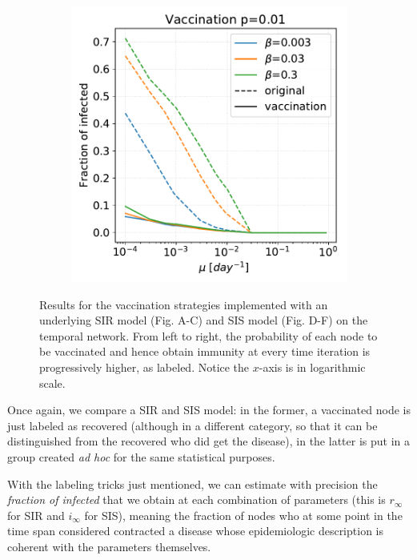 \documentclass[a4paper,11pt, twocolumn]{article}
\begin{document}
\begin{figure}[t!]
\begin{subfigure}[t]{0.32\textwidth}
\caption{}
\end{subfigure}
\begin{subfigure}[t]{0.32\textwidth}
 \centering
\includegraphics[scale=0.30]{./Figure/Simulations/SIS_vax/remove_01.pdf}
\caption{}
\end{subfigure}
\caption{Results for the vaccination strategies implemented with an underlying SIR model (Fig. A-C) and SIS model (Fig. D-F) on the temporal network. From left to right, the probability of each node to be vaccinated and hence obtain immunity at every time iteration is progressively higher, as labeled. Notice the $x$-axis is in logarithmic scale.}
\label{time_sims}
\end{figure}

Once again, we compare a SIR and SIS model: in the former, a vaccinated node is just labeled as recovered (although in a different category, so that it can be distinguished from the recovered who did get the disease), in the latter is put in a group created \emph{ad hoc} for the same statistical purposes.

With the labeling tricks just mentioned, we can estimate with precision the \emph{fraction of infected} that we obtain at each combination of parameters (this is $r_{\infty}$ for SIR and $i_{\infty}$ for SIS), meaning the fraction of nodes who at some point in the time span considered contracted a disease whose epidemiologic description is coherent with the parameters themselves. 
\end{document}
